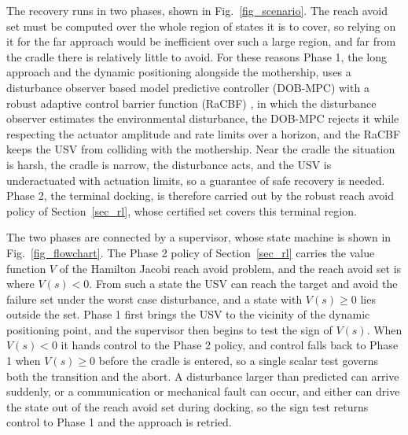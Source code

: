\documentclass[5p,times,authoryear]{elsarticle}
\begin{document}
The recovery runs in two phases, shown in Fig.~\ref{fig_scenario}. The reach avoid set must be computed over the whole region of states it is to cover, so relying on it for the far approach would be inefficient over such a large region, and far from the cradle there is relatively little to avoid. For these reasons Phase 1, the long approach and the dynamic positioning alongside the mothership, uses a disturbance observer based model predictive controller (DOB-MPC) with a robust adaptive control barrier function (RaCBF) \citep{park2026recovery}, in which the disturbance observer estimates the environmental disturbance, the DOB-MPC rejects it while respecting the actuator amplitude and rate limits over a horizon, and the RaCBF keeps the USV from colliding with the mothership. Near the cradle the situation is harsh, the cradle is narrow, the disturbance acts, and the USV is underactuated with actuation limits, so a guarantee of safe recovery is needed. Phase 2, the terminal docking, is therefore carried out by the robust reach avoid policy of Section~\ref{sec_rl}, whose certified set covers this terminal region.

The two phases are connected by a supervisor, whose state machine is shown in Fig.~\ref{fig_flowchart}. The Phase 2 policy of Section~\ref{sec_rl} carries the value function $V$ of the Hamilton Jacobi reach avoid problem, and the reach avoid set is where $V(s)<0$. From such a state the USV can reach the target and avoid the failure set under the worst case disturbance, and a state with $V(s)\ge 0$ lies outside the set. Phase 1 first brings the USV to the vicinity of the dynamic positioning point, and the supervisor then begins to test the sign of $V(s)$. When $V(s)<0$ it hands control to the Phase 2 policy, and control falls back to Phase 1 when $V(s)\ge 0$ before the cradle is entered, so a single scalar test governs both the transition and the abort. A disturbance larger than predicted can arrive suddenly, or a communication or mechanical fault can occur, and either can drive the state out of the reach avoid set during docking, so the sign test returns control to Phase 1 and the approach is retried.
\end{document}
